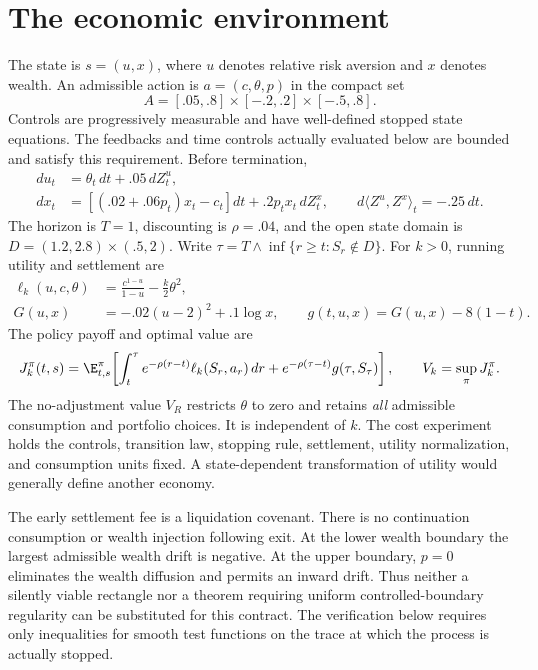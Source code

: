 \section{The economic environment}\label{r9:economy}
The state is $s=(u,x)$, where $u$ denotes relative risk aversion and $x$ denotes wealth. An admissible action is $a=(c,\theta,p)$ in the compact set
\[
 A=[.05,.8]\times[-.2,.2]\times[-.5,.8].
\]
Controls are progressively measurable and have well-defined stopped state equations. The feedbacks and time controls actually evaluated below are bounded and satisfy this requirement. Before termination,
\begin{align}
 du_t&=\theta_t\,dt+.05\,dZ^u_t,\\
 dx_t&=[(.02+.06p_t)x_t-c_t]dt+.2p_tx_t\,dZ^x_t,
 \qquad d\langle Z^u,Z^x\rangle_t=-.25\,dt.\label{r9:dynamics}
\end{align}
The horizon is $T=1$, discounting is $\rho=.04$, and the open state domain is
$D=(1.2,2.8)\times(.5,2)$. Write $\tau=T\wedge\inf\{r\geq t:S_r\notin D\}$. For $k>0$, running utility and settlement are
\begin{align}
 \ell_k(u,c,\theta)&=\frac{c^{1-u}}{1-u}-\frac{k}{2}\theta^2,\\
 G(u,x)&=-.02(u-2)^2+.1\log x,
 \qquad g(t,u,x)=G(u,x)-8(1-t).\label{r9:payoff}
\end{align}
The policy payoff and optimal value are
\begin{equation}
 J_k^\pi(t,s)=\E^\pi_{t,s}\!\left[\int_t^\tau e^{-\rho(r-t)}\ell_k(S_r,a_r)\,dr
        +e^{-\rho(\tau-t)}g(\tau,S_\tau)\right],
 \qquad V_k=\sup_\pi J_k^\pi.\label{r9:objective}
\end{equation}
The no-adjustment value $V_R$ restricts $\theta$ to zero and retains \emph{all} admissible consumption and portfolio choices. It is independent of $k$. The cost experiment holds the controls, transition law, stopping rule, settlement, utility normalization, and consumption units fixed. A state-dependent transformation of utility would generally define another economy.

The early settlement fee is a liquidation covenant. There is no continuation consumption or wealth injection following exit. At the lower wealth boundary the largest admissible wealth drift is negative. At the upper boundary, $p=0$ eliminates the wealth diffusion and permits an inward drift. Thus neither a silently viable rectangle nor a theorem requiring uniform controlled-boundary regularity can be substituted for this contract. The verification below requires only inequalities for smooth test functions on the trace at which the process is actually stopped.

